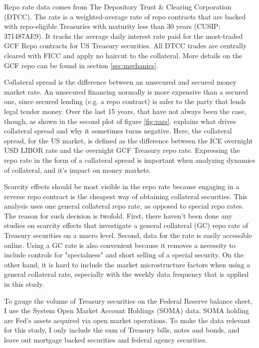 \documentclass[11pt,a4paper,english,oneside]{article}
\begin{document}
Repo rate data comes from The Depository Trust \& Clearing Corporation (DTCC). The rate is a weighted-average rate of repo contracts that are backed with repo-eligible Treasuries with maturity less than 30 years (CUSIP: 371487AE9). It tracks the average daily interest rate paid for the most-traded GCF Repo contracts for US Treasury securities. All DTCC trades are centrally cleared with FICC and apply no haircut to the collateral. More details on the GCF repo can be found in section \ref{sec:mechanics}.

Collateral spread is the difference between an unsecured and secured money market rate. An unsecured financing normally is more expensive than a secured one, since secured lending (e.g. a repo contract) is safer to the party that lends legal tender money. Over the last 15 years, that have not always been the case, though, as shown in the second plot of figure \ref{fig:vars}. \citet{nyborg2019a} explains what drives collateral spread and why it sometimes turns negative. Here, the collateral spread, for the US market, is defined as the difference between the ICE overnight USD LIBOR rate and the overnight GCF Treasury repo rate. Expressing the repo rate in the form of a collateral spread is important when analyzing dynamics of collateral, and it's impact on money markets.

Scarcity effects should be most visible in the repo rate because engaging in a reverse repo contract is the cheapest way of obtaining collateral securities. This analysis uses one general collateral repo rate, as opposed to special repo rates. The reason for such decision is twofold. First, there haven't been done any studies on scarcity effects that investigate a general collateral (GC) repo rate of Treasury securities on a macro level. Second, data for the rate is easily accessible online. Using a GC rate is also convenient because it removes a necessity to include controls for "specialness" and short selling of a special security. On the other hand, it is hard to include the market microstructure factors when using a general collateral rate, especially with the weekly data frequency that is applied in this study.

To gauge the volume of Treasury securities on the Federal Reserve balance sheet, I use the System Open Market Account Holdings (SOMA) data. SOMA holding are Fed's assets acquired via open market operations. To make the data relevant for this study, I only include the sum of Treasury bills, notes and bonds, and leave out mortgage backed securities and federal agency securities.
\end{document}
